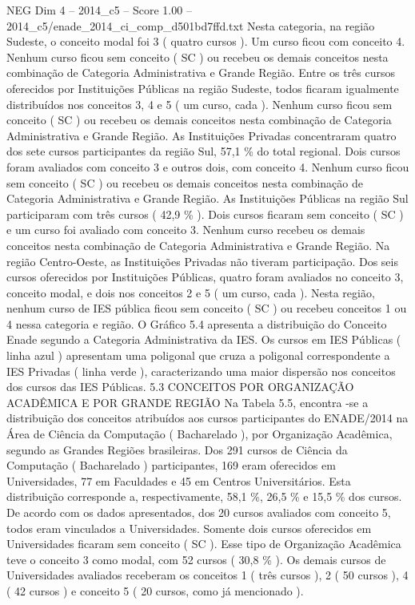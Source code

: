\begin{textsample}{NEG Dim 4 – 2014\_c5 – Score 1.00 – 2014\_c5/enade\_2014\_ci\_comp\_d501bd7ffd.txt}
Nesta categoria, na região Sudeste, o conceito modal foi 3 ( quatro cursos ).
Um curso ficou com conceito 4.
Nenhum curso ficou sem conceito ( SC ) ou recebeu os demais conceitos nesta combinação de Categoria Administrativa e Grande Região.
Entre os três cursos oferecidos por Instituições Públicas na região Sudeste, todos ficaram igualmente distribuídos nos conceitos 3, 4 e 5 ( um curso, cada ).
Nenhum curso ficou sem conceito ( SC ) ou recebeu os demais conceitos nesta combinação de Categoria Administrativa e Grande Região.
As Instituições Privadas concentraram quatro dos sete cursos participantes da região Sul, 57,1 \% do total regional.
Dois cursos foram avaliados com conceito 3 e outros dois, com conceito 4.
Nenhum curso ficou sem conceito ( SC ) ou recebeu os demais conceitos nesta combinação de Categoria Administrativa e Grande Região.
As Instituições Públicas na região Sul participaram com três cursos ( 42,9 \% ).
Dois cursos ficaram sem conceito ( SC ) e um curso foi avaliado com conceito 3.
Nenhum curso recebeu os demais conceitos nesta combinação de Categoria Administrativa e Grande Região.
Na região Centro-Oeste, as Instituições Privadas não tiveram participação.
Dos seis cursos oferecidos por Instituições Públicas, quatro foram avaliados no conceito 3, conceito modal, e dois nos conceitos 2 e 5 ( um curso, cada ).
Nesta região, nenhum curso de IES pública ficou sem conceito ( SC ) ou recebeu conceitos 1 ou 4 nessa categoria e região.
O Gráfico 5.4 apresenta a distribuição do Conceito Enade segundo a Categoria Administrativa da IES.
Os cursos em IES Públicas ( linha azul ) apresentam uma poligonal que cruza a poligonal correspondente a IES Privadas ( linha verde ), caracterizando uma maior dispersão nos conceitos dos cursos das IES Públicas. 5.3 CONCEITOS POR ORGANIZAÇÃO ACADÊMICA E POR GRANDE REGIÃO Na Tabela 5.5, encontra -se a distribuição dos conceitos atribuídos aos cursos participantes do ENADE/2014 na Área de Ciência da Computação ( Bacharelado ), por Organização Acadêmica, segundo as Grandes Regiões brasileiras.
Dos 291 cursos de Ciência da Computação ( Bacharelado ) participantes, 169 eram oferecidos em Universidades, 77 em Faculdades e 45 em Centros Universitários.
Esta distribuição corresponde a, respectivamente, 58,1 \%, 26,5 \% e 15,5 \% dos cursos.
De acordo com os dados apresentados, dos 20 cursos avaliados com conceito 5, todos eram vinculados a Universidades.
Somente dois cursos oferecidos em Universidades ficaram sem conceito ( SC ).
Esse tipo de Organização Acadêmica teve o conceito 3 como modal, com 52 cursos ( 30,8 \% ).
Os demais cursos de Universidades avaliados receberam os conceitos 1 ( três cursos ), 2 ( 50 cursos ), 4 ( 42 cursos ) e conceito 5 ( 20 cursos, como já mencionado ).

\end{textsample}
